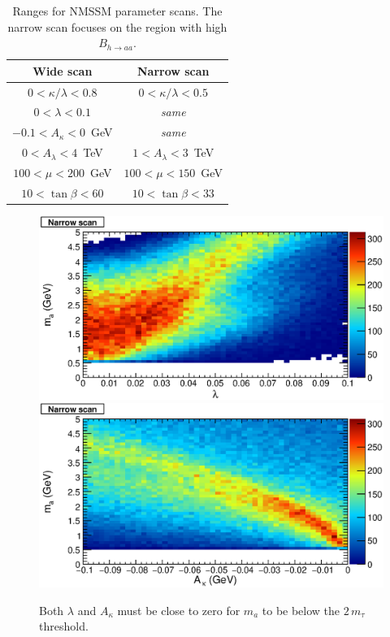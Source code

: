 \documentclass[aps,prd,onecolumn,superscriptaddress,showpacs]{revtex4}
\begin{document}
\begin{table}[htb]
\caption{Ranges for NMSSM parameter scans.  The narrow scan focuses on
the region with high $B_{h \to aa}$. \label{brhaa_table}}
\begin{center}
\renewcommand{\arraystretch}{1.2}
\begin{tabular}{| c c |}
\hline \mbox{\hspace{1.25 cm}}Wide scan\mbox{\hspace{1.25 cm}} & \mbox{\hspace{1.25 cm}}Narrow scan\mbox{\hspace{1.25 cm}} \\\hline
$0 < \kappa/\lambda < 0.8$ & $0 < \kappa/\lambda < 0.5$ \\
$0 < \lambda < 0.1$ & {\it same} \\
$-0.1 < A_\kappa < 0$~GeV & {\it same} \\
$0 < A_\lambda < 4$~TeV & $1 < A_\lambda < 3$~TeV \\
$100 < \mu < 200$~GeV & $100 < \mu < 150$~GeV \\
$10 < \tan\beta < 60$ & $10 < \tan\beta < 33$ \\\hline
\end{tabular}
\end{center}
\end{table}

\begin{figure}[htb]
\begin{center}
\includegraphics[width=0.45\linewidth]{plots/pmass1_lambda.eps}
\includegraphics[width=0.45\linewidth]{plots/pmass1_Akappa.eps}

\caption{Both $\lambda$ and $A_\kappa$ must be close to zero for $m_a$
  to be below the $2 \, m_\tau$ threshold. \label{pmass1_Akappa}}
\end{center}
\end{figure}
\end{document}
